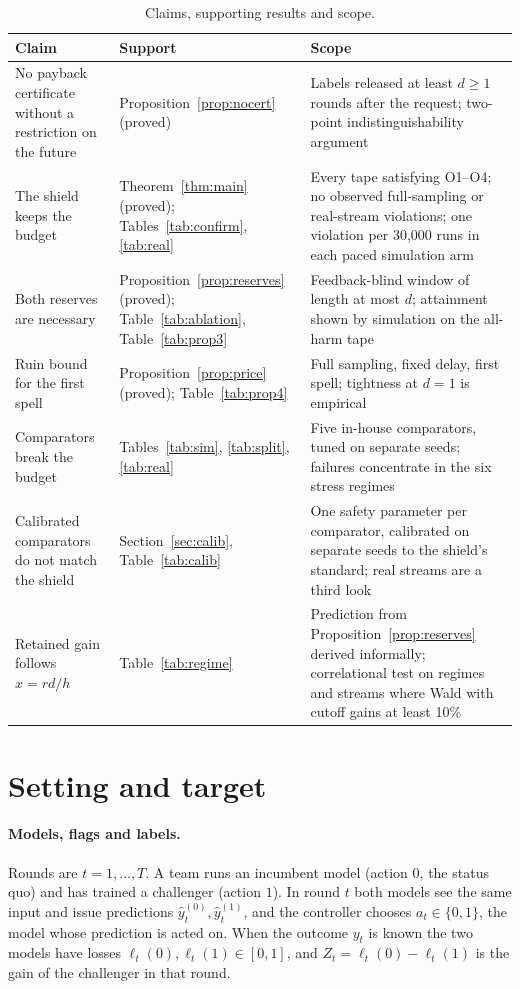 \documentclass[10pt]{article}
\theoremstyle{plain}
\theoremstyle{definition}
\begin{document}
\begin{table}[t]
\caption{Claims, supporting results and scope.}\label{tab:claims}
\centering\small
\begin{tabular}{@{}p{4.6cm} p{4.7cm} p{5.6cm}@{}}
\toprule
Claim & Support & Scope \\
\midrule
No payback certificate without a restriction on the future & Proposition~\ref{prop:nocert} (proved) & Labels released at least $d\ge1$ rounds after the request; two-point indistinguishability argument \\
The shield keeps the budget & Theorem~\ref{thm:main} (proved); Tables~\ref{tab:confirm}, \ref{tab:real} & Every tape satisfying O1--O4; no observed full-sampling or real-stream violations; one violation per 30,000 runs in each paced simulation arm \\
Both reserves are necessary & Proposition~\ref{prop:reserves} (proved); Table~\ref{tab:ablation}, Table~\ref{tab:prop3} & Feedback-blind window of length at most $d$; attainment shown by simulation on the all-harm tape \\
Ruin bound for the first spell & Proposition~\ref{prop:price} (proved); Table~\ref{tab:prop4} & Full sampling, fixed delay, first spell; tightness at $d=1$ is empirical \\
Comparators break the budget & Tables~\ref{tab:sim}, \ref{tab:split}, \ref{tab:real} & Five in-house comparators, tuned on separate seeds; failures concentrate in the six stress regimes \\
Calibrated comparators do not match the shield & Section~\ref{sec:calib}, Table~\ref{tab:calib} & One safety parameter per comparator, calibrated on separate seeds to the shield's standard; real streams are a third look \\
Retained gain follows $x=rd/h$ & Table~\ref{tab:regime} & Prediction from Proposition~\ref{prop:reserves} derived informally; correlational test on regimes and streams where Wald with cutoff gains at least 10\% \\
\bottomrule
\end{tabular}
\end{table}

\section{Setting and target}\label{sec:setting}
\paragraph{Models, flags and labels.}
Rounds are $t=1,\dots,T$. A team runs an incumbent model (action $0$, the status quo) and has trained a challenger (action $1$). In round $t$ both models see the same input and issue predictions $\hat y^{(0)}_t,\hat y^{(1)}_t$, and the controller chooses $a_t\in\{0,1\}$, the model whose prediction is acted on. When the outcome $y_t$ is known the two models have losses $\ell_t(0),\ell_t(1)\in[0,1]$, and $Z_t=\ell_t(0)-\ell_t(1)$ is the gain of the challenger in that round.
\end{document}

